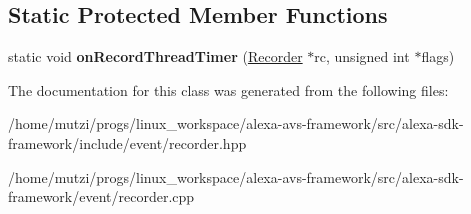 \subsection*{Static Protected Member Functions}
\begin{DoxyCompactItemize}
\item 
\mbox{\label{classAlexaEvent_1_1Recorder_af48d8e53343a71a527052e9dcce7e7c0}} 
static void {\bfseries on\+Record\+Thread\+Timer} (\hyperlink{classAlexaEvent_1_1Recorder}{Recorder} $\ast$rc, unsigned int $\ast$flags)
\end{DoxyCompactItemize}


The documentation for this class was generated from the following files\+:\begin{DoxyCompactItemize}
\item 
/home/mutzi/progs/linux\+\_\+workspace/alexa-\/avs-\/framework/src/alexa-\/sdk-\/framework/include/event/recorder.\+hpp\item 
/home/mutzi/progs/linux\+\_\+workspace/alexa-\/avs-\/framework/src/alexa-\/sdk-\/framework/event/recorder.\+cpp\end{DoxyCompactItemize}

